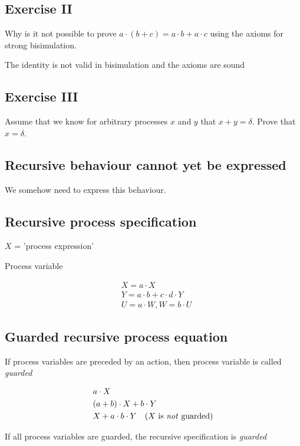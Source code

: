 \subsection{Exercise II}
Why is it not possible to prove $a \cdot (b + c) = a \cdot b + a \cdot c$ using the axioms for
strong bisimulation.

The identity is not valid in bisimulation and the axioms are sound

\subsection{Exercise III}
Assume that we know for arbitrary processes $x$ and $y$ that $x + y = \delta$. Prove that $x = \delta$.

\subsection{Recursive behaviour cannot yet be expressed}
We somehow need to express this behaviour.

\subsection{Recursive process specification}

$X$ = 'process expression'

Process variable

\begin{align*}
  & X = a \cdot X \\
  & Y = a \cdot b + c \cdot d \cdot Y \\
  & U = a \cdot W, W = b \cdot U
\end{align*}

\subsection{Guarded recursive process equation}

If process variables are preceded by an action, then process variable is called \emph{guarded}

\begin{align*}
  & a \cdot X \\
  & (a + b) \cdot X + b \cdot Y \\
  & X + a \cdot b \cdot Y \quad (X \text{ is \emph{not} guarded})
\end{align*}

If all process variables are guarded, the recursive specification is \emph{guarded}

